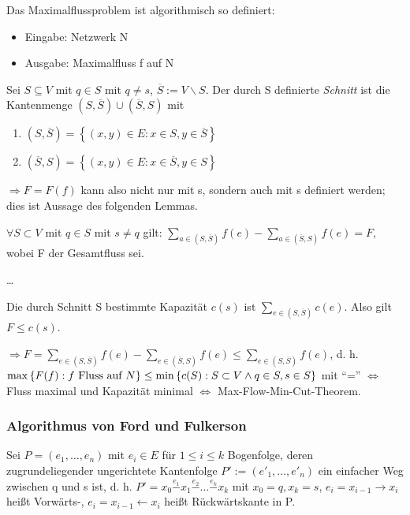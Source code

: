 \documentclass[10pt]{scrbook}
\begin{document}
\begin{Def}
Das Maximalflussproblem ist algorithmisch so definiert:
\begin{itemize}
\item Eingabe: Netzwerk N
\item Ausgabe: Maximalfluss f auf N
\end{itemize}
\end{Def}

\begin{Def}
Sei $S\subseteq V$ mit $q\in S$ mit $q\neq s$, $\overline{S}:=V\backslash S$. Der durch S definierte \emph{Schnitt} ist die Kantenmenge $(S, \overline{S}) \cup (\overline{S}, S)$ mit
\begin{enumerate}
\item $(S, \overline{S})=\left\{(x, y)\in E: x\in S, y\in \overline{S}\right\}$
\item $(\overline{S}, S)=\left\{(x, y)\in E: x\in \overline{S}, y\in S\right\}$
\end{enumerate}
$\Rightarrow F=F(f)$ kann also nicht nur mit s, sondern auch mit s definiert werden; dies ist Aussage des folgenden Lemmas.
\end{Def}

\begin{Le}
\label{le:2.8}
$\forall S\subset V$ mit $q\in S$ mit $s\neq q$ gilt: $\sum_{a\in (S, \overline{S})} f(e)-\sum_{a\in (\overline{S}, S)} f(e)=F$, wobei F der Gesamtfluss sei.
\end{Le}
\begin{bew}
\ldots
\end{bew}

\begin{Def}
Die durch Schnitt S bestimmte Kapazität $c(s)$ ist $\sum_{e\in (S, \overline{S})}c(e)$. Also gilt $F\leq c(s)$.

$\Rightarrow F = \sum_{e\in (S, \overline{S})} f(e)-\sum_{e\in (\overline{S}, S)} f(e)\leq \sum_{e\in (S, \overline{S})} f(e)$, d. h. $\max \left\{F(f): f\textnormal{ Fluss auf }N\right\}\leq \min \left\{c(S): S\subset V\wedge q\in S, s\in S \right\}$ mit "`="' $\Leftrightarrow$ Fluss maximal und Kapazität minimal  $\Leftrightarrow$ Max-Flow-Min-Cut-Theorem.
\end{Def}

\subsubsection{Algorithmus von Ford und Fulkerson}

\begin{Def}
Sei $P=\left(e_1, \ldots, e_n\right)$ mit $e_i\in E$ für $1\leq i\leq k$ Bogenfolge, deren zugrundeliegender ungerichtete Kantenfolge $P':=\left(e'_1, \ldots, e'_n\right)$ ein einfacher Weg zwischen q und s ist, d. h. $P'=x_0\stackrel{e_1}- x_1 \stackrel{e_2}-\ldots \stackrel{e_k}- x_k$ mit $x_0=q, x_k=s$, $e_i=x_{i-1}\rightarrow x_i$ heißt Vorwärts-, $e_i=x_{i-1}\leftarrow x_i$ heißt Rückwärtskante in P.
\end{Def}
\end{document}
